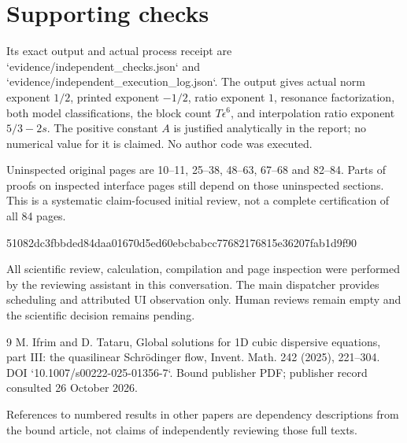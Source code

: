 \documentclass[10pt]{article}
\begin{document}
\section*{Supporting checks}
Its exact output and actual process receipt are `evidence/independent\_checks.json` and `evidence/independent\_execution\_log.json`. The output gives actual norm exponent \(1/2\), printed exponent \(-1/2\), ratio exponent \(1\), resonance factorization, both model classifications, the block count \(T\epsilon^6\), and interpolation ratio exponent \(5/3-2s\). The positive constant \(A\) is justified analytically in the report; no numerical value for it is claimed. No author code was executed.\par
Uninspected original pages are 10–11, 25–38, 48–63, 67–68 and 82–84. Parts of proofs on inspected interface pages still depend on those uninspected sections. This is a systematic claim-focused initial review, not a complete certification of all 84 pages.\par
51082dc3fbbded84daa01670d5ed60ebcbabcc77682176815e36207fab1d9f90\par
All scientific review, calculation, compilation and page inspection were performed by the reviewing assistant in this conversation. The main dispatcher provides scheduling and attributed UI observation only. Human reviews remain empty and the scientific decision remains pending.\par
9 M. Ifrim and D. Tataru, Global solutions for 1D cubic dispersive equations, part III: the quasilinear Schrödinger flow, Invent. Math. 242 (2025), 221–304. DOI `10.1007/s00222-025-01356-7`. Bound publisher PDF; publisher record consulted 26 October 2026.\par
References to numbered results in other papers are dependency descriptions from the bound article, not claims of independently reviewing those full texts.\par
\end{document}
